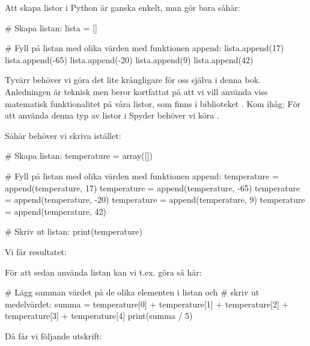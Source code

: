 Att skapa listor i Python är ganska enkelt, man gör bara såhär:

\begin{python}[caption={Skapa lista},label={ex:skapavektor1}]
# Skapa listan:
lista = []

# Fyll på listan med olika värden med funktionen append:
lista.append(17)
lista.append(-65)
lista.append(-20)
lista.append(9)
lista.append(42)
\end{python}

Tyvärr behöver vi göra det lite krångligare för oss själva i denna bok. Anledningen är teknisk men beror kortfattat på att vi vill använda viss matematisk funktionalitet på våra listor, som finns i biblioteket . Kom ihåg: För att använda denna typ av listor i Spyder behöver vi köra .

Såhär behöver vi skriva istället:

\begin{python}[caption={Skapa lista},label={ex:skapavektor1}]
# Skapa listan:
temperature = array([])

# Fyll på listan med olika värden med funktionen append:
temperature = append(temperature, 17)
temperature = append(temperature, -65)
temperature = append(temperature, -20)
temperature = append(temperature, 9)
temperature = append(temperature, 42)

# Skriv ut listan:
print(temperature)
\end{python}

Vi får resultatet:

\begin{python}
[17. -65. -20. 9. 42.]
\end{python}

\newpage
För att sedan använda listan kan vi t.ex. göra så här:

\begin{python}[caption={Använda lista},label={ex:lasavektor1}]
# Lägg samman värdet på de olika elementen i listan och
# skriv ut medelvärdet:
summa = temperature[0] + temperature[1] + temperature[2] + temperature[3] + temperature[4]
print(summa / 5)
\end{python}

Då får vi följande utskrift:

